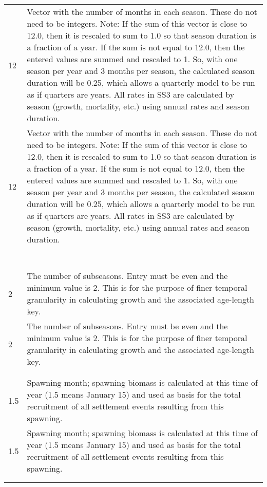 \begin{center}
\begin{longtable}{p{4cm} p{12cm}}
		\hline
		12 & \multirow{1}{1cm}[-0.1cm]{\parbox{12cm}{Vector with the number of months in each season. These do not need to be integers. Note: If the sum of this vector is close to 12.0, then it is rescaled to sum to 1.0 so that season duration is a fraction of a year. If the sum is not equal to 12.0, then the entered values are summed and rescaled to 1. So, with one season per year and 3 months per season, the calculated season duration will be 0.25, which allows a quarterly model to be run as if quarters are years. All rates in SS3 are calculated by season (growth, mortality, etc.) using annual rates and season duration.}} \Tstrut\\
		12 & \multirow{1}{1cm}[-0.1cm]{\parbox{12cm}{Vector with the number of months in each season. These do not need to be integers. Note: If the sum of this vector is close to 12.0, then it is rescaled to sum to 1.0 so that season duration is a fraction of a year. If the sum is not equal to 12.0, then the entered values are summed and rescaled to 1. So, with one season per year and 3 months per season, the calculated season duration will be 0.25, which allows a quarterly model to be run as if quarters are years. All rates in SS3 are calculated by season (growth, mortality, etc.) using annual rates and season duration.}} \Tstrut\\
		& \\
		& \\
		& \\
		& \\
		& \\
		& \\
		& \Bstrut\\
		
		\hline
		2 & \multirow{1}{1cm}[-0.1cm]{\parbox{12cm}{The number of subseasons. Entry must be even and the minimum value is 2. This is for the purpose of finer temporal granularity in calculating growth and the associated age-length key.}} \Tstrut\\
		2 & \multirow{1}{1cm}[-0.1cm]{\parbox{12cm}{The number of subseasons. Entry must be even and the minimum value is 2. This is for the purpose of finer temporal granularity in calculating growth and the associated age-length key.}} \Tstrut\\
		& \\
		& \Bstrut\\
		
		\hline
		\hypertarget{RecrTiminig}{1.5} & \multirow{1}{1cm}[-0.1cm]{\parbox{12cm}{Spawning month; spawning biomass is calculated at this time of year (1.5 means January 15) and used as basis for the total recruitment of all settlement events resulting from this spawning.}} \Tstrut\\
		\hypertarget{RecrTiminig}{1.5} & \multirow{1}{1cm}[-0.1cm]{\parbox{12cm}{Spawning month; spawning biomass is calculated at this time of year (1.5 means January 15) and used as basis for the total recruitment of all settlement events resulting from this spawning.}} \Tstrut\\
		& \\
		& \Bstrut\\


\end{longtable}
\end{center}
